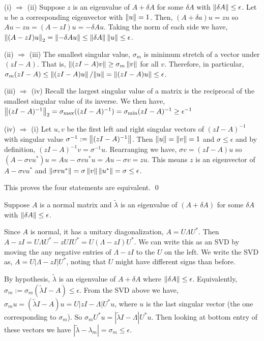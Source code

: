 \documentclass[10pt]{article}
\begin{document}
\begin{solution}[Solution]
(i) \( \Rightarrow \) (ii) Suppose \( z \) is an eigenvalue of \( A+\delta A \) for some \( \delta A \) with \( \left\lVert\delta A\right\rVert \leq \epsilon \). Let \( u \) be a corresponding eigenvector with \( \left\lVert u\right\rVert=1 \). Then, \( (A+\delta a) u = z u \) so \( Au-zu = (A-zI)u = -\delta Au \). Taking the norm of each side we have, \( \left\lVert(A-zI)u\right\rVert_2 = \left\lVert-\delta A u\right\rVert \leq \left\lVert\delta A\right\rVert\left\lVert u\right\rVert \leq \epsilon \).

(ii) \( \Rightarrow \) (iii) The smallest singular value, \( \sigma_m \) is minimum stretch of a vector under \( (zI-A) \). That is, \( \left\lVert(zI-A)v\right\rVert \geq \sigma_m \left\lVert v\right\rVert \) for all \( v \). Therefore, in particular, \( \sigma_m(zI-A) \leq \left\lVert(zI-A)u\right\rVert/{\left\lVert u\right\rVert} = \left\lVert(zI-A)u\right\rVert \leq \epsilon \).

(iii) \( \Rightarrow \) (iv) Recall the largest singular value of a matrix is the reciprocal of the smallest singular value of its inverse. We then have, \( \left\lVert(zI-A)^{-1}\right\rVert_2 = \sigma_{\text{max}}((zI-A)^{-1})= \sigma_{\text{min}}(zI-A)^{-1}\geq \epsilon^{-1} \)

(iv) \( \Rightarrow \) (i) Let \( u,v \) be the first left and right singular vectors of \( (zI-A)^{-1} \) with singular value \( \sigma^{-1} := \left\lVert(zI-A)^{-1}\right\rVert \). Then \( \left\lVert u\right\rVert = \left\lVert v\right\rVert = 1 \) and \( \sigma \leq \epsilon \) and by definition, \( (zI-A)^{-1}v = \sigma^{-1} u \). Rearranging we have, \( \sigma v = (zI-A) u \) so \( (A-\sigma vu^*)u = Au-\sigma v u^*u = Au-\sigma v = zu \). This means \( z \) is an eigenvector of \( A-\sigma v u^* \) and \( \left\lVert\sigma v u^*\right\rVert = \sigma \left\lVert v\right\rVert \left\lVert u^*\right\rVert = \sigma \leq \epsilon \).

This proves the four statements are equivalent. \qed

Suppose \( A \) is a normal matrix and \( \tilde{\lambda} \) is an eigenvalue of \( (A+\delta A) \) for some \( \delta A \) with \( \left\lVert\delta A\right\rVert \leq \epsilon \).

Since \( A \) is normal, it has a unitary diagonalization, \( A=U\Lambda U^* \). Then \( A-zI = U\Lambda U^* - z UIU^* = U(\Lambda-zI)U^* \). We can write this as an SVD by moving the any negative entries of \( \Lambda-zI \) to the \( U \) on the left. We write the SVD as, \( A = U|\Lambda-zI|U^* \), noting that \( U \) might have different signs than before.

By hypothesis, \( \tilde{\lambda} \) is an eigenvalue of \( A+\delta A \) where \( \left\lVert\delta A\right\rVert\leq \epsilon \). Equivalently, \( \sigma_m:=\sigma_m(\tilde{\lambda}I-A) \leq \epsilon \). From the SVD above we have, \( \sigma_m u =  (\tilde{\lambda}I-A)u = U|zI-\Lambda|U^*u \), where \( u \) is the last singular vector (the one corresponding to \( \sigma_m \)). So \( \sigma_m U^*u = | \tilde{\lambda}I-\Lambda|U^*u \). Then looking at bottom entry of these vectors we have \( | \tilde{\lambda} -\lambda_m| = \sigma_m \leq \epsilon \).


\end{solution}
\end{document}
